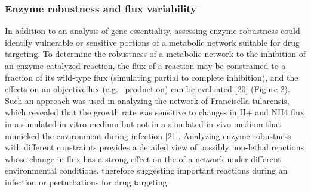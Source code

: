 \subsubsection{Enzyme robustness and flux variability}
In addition to an analysis of gene essentiality, assessing enzyme 
robustness could identify vulnerable or sensitive portions of a 
metabolic network suitable for drug targeting. To determine the 
robustness of a metabolic network to the inhibition of an 
enzyme-catalyzed reaction, the \gls{flux} of a reaction may be constrained 
to a fraction of its wild-type \gls{flux} (simulating partial to 
complete inhibition), and the effects on an \gls{objectiveflux} 
(e.g.\  production) can be evaluated [20] (Figure 2). 
Such an approach was used in analyzing the network  
of Francisella tularensis, which revealed that the growth rate 
was sensitive to changes in H+ and NH4 \gls{flux} in a simulated in vitro 
medium but not in a simulated in vivo medium that mimicked the 
environment during infection [21]. Analyzing enzyme robustness with 
different constraints provides a detailed view of possibly non-lethal 
reactions whose change in \gls{flux} has a strong effect on the  
of a network under different environmental conditions, therefore 
suggesting important reactions during an infection or perturbations 
for drug targeting.

